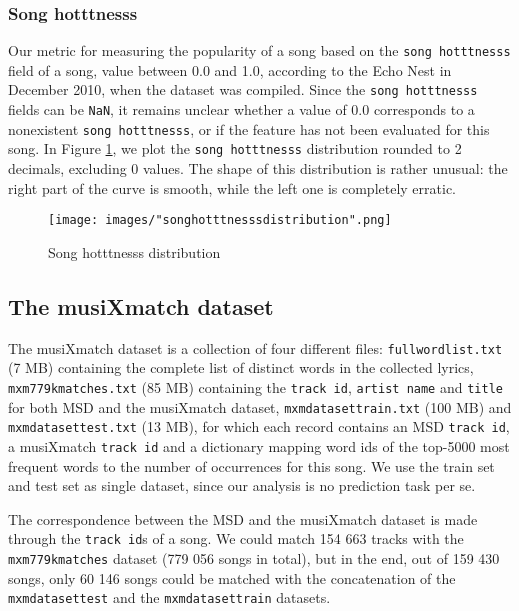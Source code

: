 \documentclass[11pt]{article}
\renewcommand\_{\textunderscore\allowbreak}
\begin{document}
\subsubsection{Song hotttnesss}
Our metric for measuring the popularity of a song based on the \texttt{song hotttnesss} field of a song, value between 0.0 and 1.0, according to the Echo Nest in December 2010, when the dataset was compiled.
Since the \texttt{song hotttnesss} fields can be \texttt{NaN}, it remains unclear whether a value of 0.0 corresponds to a nonexistent \texttt{song hotttnesss}, or if the feature has not been evaluated for this song.
In Figure \ref{fig:song_hotttnesss_distribution}, we plot the \texttt{song hotttnesss} distribution rounded to 2 decimals, excluding 0 values. 
The shape of this distribution is rather unusual: the right part of the curve is smooth, while the left one is completely erratic.
\begin{figure}[h!]
\centering
\captionsetup{width=1.0\textwidth}
\texttt{[image: images/"song\_hotttnesss\_distribution".png]}
\caption{Song hotttnesss distribution}
\label{fig:song_hotttnesss_distribution}
\end{figure}

\subsection{The musiXmatch dataset}
The musiXmatch dataset is a collection of four different files: 
\texttt{full\_word\_list.txt} (7 MB) containing the complete list of distinct words in the collected lyrics, \texttt{mxm\_779k\_matches.txt} (85 MB) containing the \texttt{track id}, \texttt{artist name} and \texttt{title} for both MSD and the musiXmatch dataset, \texttt{mxm\_dataset\_train.txt} (100 MB) and \texttt{mxm\_dataset\_test.txt} (13 MB), for which each record contains an MSD \texttt{track id}, a musiXmatch \texttt{track id} and a dictionary mapping word ids of the top-5000 most frequent words to the number of occurrences for this song.
We use the train set and test set as single dataset, since our analysis is no prediction task per se.

The correspondence between the MSD and the musiXmatch dataset is made through the \texttt{track id}s of a song.
We could match 154 663 tracks with the \texttt{mxm\_779k\_matches} dataset (779 056 songs in total), but in the end, out of 159 430 songs, only 60 146 songs could be matched with the concatenation of the \texttt{mxm\_dataset\_test} and the \texttt{mxm\_dataset\_train} datasets.
\end{document}
